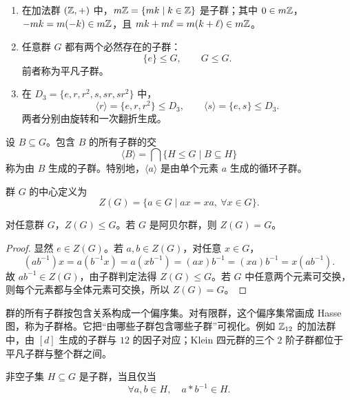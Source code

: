 \begin{example}[title={子群的基本例子}]\label{subgroup-examples}
  \begin{enumerate}
    \item 在加法群 $(\mathbb{Z},+)$ 中，$m\mathbb{Z}=\{mk\mid k\in\mathbb{Z}\}$ 是子群；其中
    $0\in m\mathbb{Z}$，$-mk=m(-k)\in m\mathbb{Z}$，且
    $mk+m\ell=m(k+\ell)\in m\mathbb{Z}$。
    \item 任意群 $G$ 都有两个必然存在的子群：
    \[
    \{e\}\le G,\qquad G\le G.
    \]
    前者称为平凡子群。
    \item 在 $D_3=\{e,r,r^2,s,sr,sr^2\}$ 中，
    \[
    \langle r\rangle=\{e,r,r^2\}\le D_3,\qquad
    \langle s\rangle=\{e,s\}\le D_3.
    \]
    两者分别由旋转和一次翻折生成。
  \end{enumerate}
\end{example}

\begin{definition}[生成子群与群的中心]\label{generated-center}
  设 $B\subseteq G$。包含 $B$ 的所有子群的交
  \[
  \langle B\rangle=\bigcap\{H\le G\mid B\subseteq H\}
  \]
  称为由 $B$ 生成的子群。特别地，$\langle a\rangle$ 是由单个元素 $a$ 生成的循环子群。

  群 $G$ 的中心定义为
  \[
  Z(G)=\{a\in G\mid ax=xa,\ \forall x\in G\}.
  \]
\end{definition}

\begin{theorem}[中心是子群]\label{center-subgroup}
  对任意群 $G$，$Z(G)\le G$。若 $G$ 是阿贝尔群，则 $Z(G)=G$。
\end{theorem}

\begin{proof}
  显然 $e\in Z(G)$。若 $a,b\in Z(G)$，对任意 $x\in G$，
  \[
  (ab^{-1})x=a(b^{-1}x)=a(xb^{-1})=(ax)b^{-1}=(xa)b^{-1}=x(ab^{-1}).
  \]
  故 $ab^{-1}\in Z(G)$，由子群判定法得 $Z(G)\le G$。若 $G$ 中任意两个元素可交换，则每个元素都与全体元素可交换，所以 $Z(G)=G$。
\end{proof}

群的所有子群按包含关系构成一个偏序集。对有限群，这个偏序集常画成 Hasse 图，称为子群格。它把“由哪些子群包含哪些子群”可视化。例如 $\mathbb{Z}_{12}$ 的加法群中，由 $[d]$ 生成的子群与 $12$ 的因子对应；Klein 四元群的三个 $2$ 阶子群都位于平凡子群与整个群之间。

\begin{theorem}[子群判定法]\label{subgroup-test}
  非空子集 $H\subseteq G$ 是子群，当且仅当
  \[
  \forall a,b\in H,\quad a*b^{-1}\in H.
  \]
\end{theorem}

